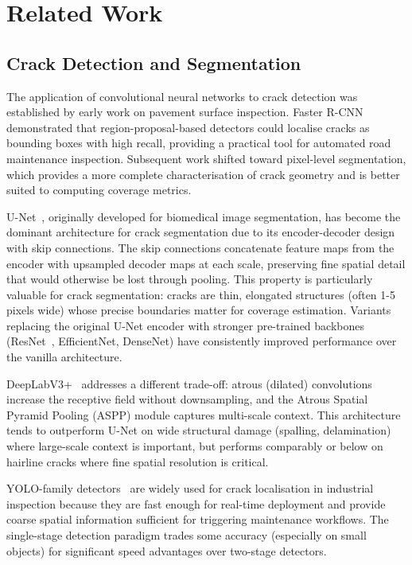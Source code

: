 \documentclass[12pt,a4paper]{article}
\begin{document}
\clearpage
\section{Related Work}

\subsection{Crack Detection and Segmentation}

The application of convolutional neural networks to crack detection was established by early work on pavement surface inspection. Faster R-CNN~\cite{ren2015faster} demonstrated that region-proposal-based detectors could localise cracks as bounding boxes with high recall, providing a practical tool for automated road maintenance inspection. Subsequent work shifted toward pixel-level segmentation, which provides a more complete characterisation of crack geometry and is better suited to computing coverage metrics.

U-Net~\cite{ronneberger2015unet}, originally developed for biomedical image segmentation, has become the dominant architecture for crack segmentation due to its encoder-decoder design with skip connections. The skip connections concatenate feature maps from the encoder with upsampled decoder maps at each scale, preserving fine spatial detail that would otherwise be lost through pooling. This property is particularly valuable for crack segmentation: cracks are thin, elongated structures (often 1-5 pixels wide) whose precise boundaries matter for coverage estimation. Variants replacing the original U-Net encoder with stronger pre-trained backbones (ResNet~\cite{he2016resnet}, EfficientNet, DenseNet) have consistently improved performance over the vanilla architecture.

DeepLabV3+~\cite{chen2018deeplab} addresses a different trade-off: atrous (dilated) convolutions increase the receptive field without downsampling, and the Atrous Spatial Pyramid Pooling (ASPP) module captures multi-scale context. This architecture tends to outperform U-Net on wide structural damage (spalling, delamination) where large-scale context is important, but performs comparably or below on hairline cracks where fine spatial resolution is critical.

YOLO-family detectors~\cite{redmon2016yolo} are widely used for crack localisation in industrial inspection because they are fast enough for real-time deployment and provide coarse spatial information sufficient for triggering maintenance workflows. The single-stage detection paradigm trades some accuracy (especially on small objects) for significant speed advantages over two-stage detectors.
\end{document}
